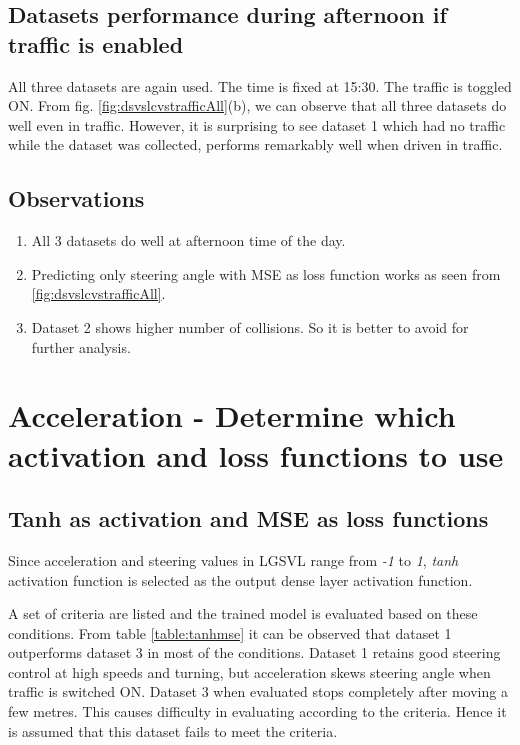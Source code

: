 \subsection{Datasets performance during afternoon if traffic is enabled}
All three datasets are again used. The time is fixed at 15:30. The traffic is toggled ON.
From fig. \ref{fig:dsvslcvstrafficAll}(b), we can observe that all three datasets do
well even in traffic. However, it is surprising to see dataset 1 which had no traffic
while the dataset was collected, performs remarkably well when driven in traffic.
\subsection{Observations}
\begin{enumerate}
    \item All 3 datasets do well at afternoon time of the day.
    \item Predicting only steering angle with MSE as loss function works as seen from
        \ref{fig:dsvslcvstrafficAll}.
    \item Dataset 2 shows higher number of collisions. So it is better to avoid for
        further analysis.
\end{enumerate}

\section{Acceleration - Determine which activation and loss functions to use}

\subsection{Tanh as activation and MSE as loss functions}
Since acceleration and steering values in LGSVL range from \textit{-1} to \textit{1},
\textit{tanh} activation function is selected as the output dense layer activation
function.

A set of criteria are listed and the trained model is evaluated based on these conditions.
From table \ref{table:tanhmse} it can be observed that dataset 1 outperforms dataset 3 in
most of the conditions. Dataset 1 retains good steering control at high speeds and
turning, but acceleration skews steering angle when traffic is switched ON. Dataset 3 when
evaluated stops completely after moving a few metres. This causes difficulty in evaluating
according to the criteria. Hence it is assumed that this dataset fails to meet the
criteria.

